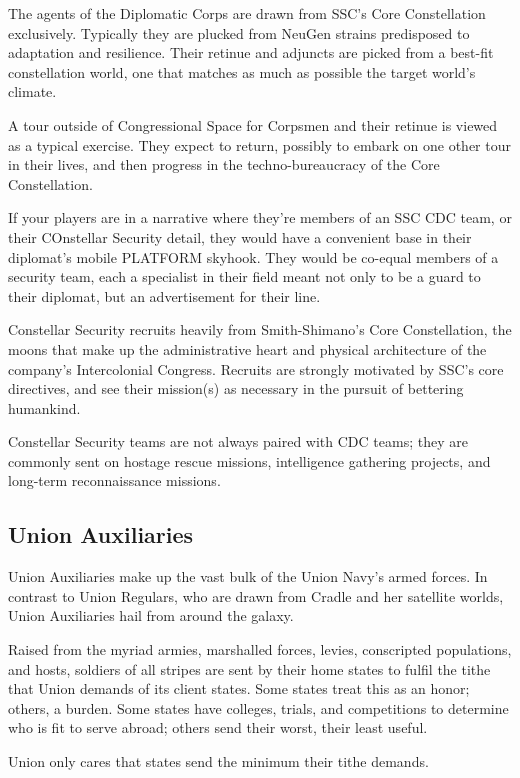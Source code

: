 The agents of the Diplomatic Corps are drawn from SSC's Core Constellation exclusively.
Typically they are plucked from NeuGen strains predisposed to adaptation and resilience. Their
retinue and adjuncts are picked from a best-fit constellation world, one that matches as much as
possible the target world's climate.

A tour outside of Congressional Space for Corpsmen and their retinue is viewed as a typical
exercise. They expect to return, possibly to embark on one other tour in their lives, and then
progress in the techno-bureaucracy of the Core Constellation.

If your players are in a narrative where they're members of an SSC CDC team, or their COnstellar
Security detail, they would have  a convenient base in their diplomat's mobile PLATFORM
skyhook. They would be co-equal members of a security team, each a specialist in their field
meant not only to be a guard to their diplomat, but an advertisement for their line.

Constellar Security recruits heavily from Smith-Shimano's Core Constellation, the moons that
make up the administrative heart and physical architecture of the company's Intercolonial
Congress. Recruits are strongly motivated by SSC's core directives, and see their mission(s) as
necessary in the pursuit of bettering humankind.

Constellar Security teams are not always paired with CDC teams; they are commonly sent on
hostage rescue missions, intelligence gathering projects, and long-term reconnaissance missions.

\subsection{Union Auxiliaries}

Union Auxiliaries make up the vast bulk of the Union Navy's armed forces. In contrast to Union
Regulars, who are drawn from Cradle and her satellite worlds, Union Auxiliaries hail from around
the galaxy.

Raised from the myriad armies, marshalled forces, levies, conscripted populations, and hosts,
soldiers of all stripes are sent by their home states to fulfil the tithe that Union demands of its
client states. Some states treat this as an honor; others, a burden. Some states have colleges,
trials, and competitions to determine who is fit to serve abroad; others send their worst, their
least useful.

Union only cares that states send the minimum their tithe demands.

